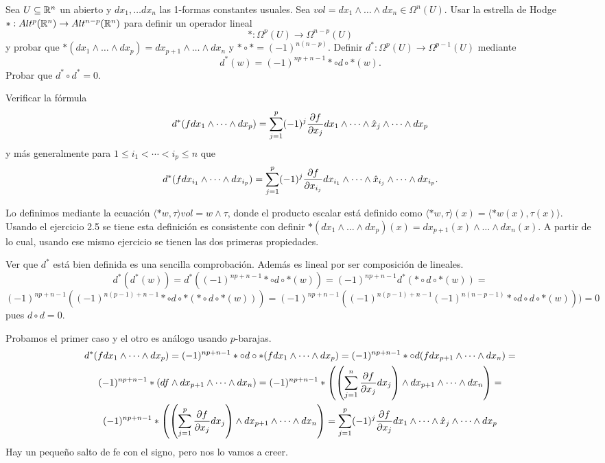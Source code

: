 \documentclass[twoside]{article}
\begin{document}
\begin{ejercicio}{3.2}
Sea $U\subseteq\mathbb{R}^n$ un abierto y $dx_1,\dots dx_n$ las 1-formas constantes usuales. Sea $vol=dx_1\land\dots\land dx_n\in\Omega^n(U)$. Usar la estrella de Hodge $*:Alt^p(\mathbb{R}^n)\to Alt^{n-p}(\mathbb{R}^n)$ para definir un operador lineal  $$*:\Omega^p(U)\to\Omega^{n-p}(U)$$
y probar que $*(dx_1\land\dots\land dx_p)=dx_{p+1}\land\dots\land dx_n$ y $*\circ *=(-1)^{n(n-p)}$. Definir $d^*:\Omega^p(U)\to\Omega^{p-1}(U)$ mediante
$$d^*(w)=(-1)^{np+n-1}*\circ d\circ *(w).$$
Probar que $d^*\circ d^*=0$. 

Verificar la fórmula 
\[
d^*(fdx_1\land\dots\land dx_p)=\sum_{j=1}^p(-1)^j\frac{\partial f}{\partial x_j}dx_1\land\dots\land\hat{x}_j\land\dots\land dx_p
\]
y más generalmente para $1\leq i_1<\cdots <i_p\leq n$ que 
\[
d^*(fdx_{i_1}\land\dots\land dx_{i_p})=\sum_{j=1}^p(-1)^j\frac{\partial f}{\partial x_{i_j}}dx_{i_1}\land\dots\land\hat{x}_{i_j}\land\dots\land dx_{i_p}.
\]
\end{ejercicio}
\begin{solucion}
Lo definimos mediante la ecuación $\langle *w,\tau\rangle vol =w\land\tau$, donde el producto escalar está definido como $\langle *w,\tau\rangle(x)=\langle *w(x), \tau(x)\rangle$. Usando el ejercicio 2.5 se tiene esta definición es consistente con definir $*(dx_1\land\dots\land dx_p)(x)=dx_{p+1}(x)\land\dots\land dx_n(x)$. A partir de lo cual, usando ese mismo ejercicio se tienen las dos primeras propiedades.

Ver que $d^*$ está bien definida es una sencilla comprobación. Además es lineal por ser composición de lineales.
\[
d^*(d^*(w))=d^*((-1)^{np+n-1}*\circ d\circ *(w))=(-1)^{np+n-1}d^*(*\circ d\circ *(w))=
\]
\[
(-1)^{np+n-1}((-1)^{n(p-1)+n-1}*\circ d\circ *(*\circ d\circ *(w)))=(-1)^{np+n-1}((-1)^{n(p-1)+n-1}(-1)^{n(n-p-1)}*\circ d\circ d\circ *(w)))=0
\]
pues $d\circ d=0$.

Probamos el primer caso y el otro es análogo usando $p$-barajas.
\begin{gather*}
d^*(fdx_1\land\dots\land dx_p)=(-1)^{np+n-1}*\circ d\circ *(fdx_1\land\dots\land dx_p)=(-1)^{np+n-1}*\circ d( f dx_{p+1}\land\dots\land dx_n)=\\
(-1)^{np+n-1}*(d f\land dx_{p+1}\land\dots\land dx_n)=(-1)^{np+n-1}*\left(\left(\sum_{j=1}^n\frac{\partial f}{\partial x_j}dx_j\right)\land dx_{p+1}\land\dots\land dx_n\right)=\\
(-1)^{np+n-1}*\left(\left(\sum_{j=1}^p\frac{\partial f}{\partial x_j}dx_j\right)\land dx_{p+1}\land\dots\land dx_n\right)=\sum_{j=1}^p(-1)^j\frac{\partial f}{\partial x_j}dx_1\land\dots\land\hat{x}_j\land\dots\land dx_p
\end{gather*}
Hay un pequeño salto de fe con el signo, pero nos lo vamos a creer.
\end{solucion}
\newpage
\end{document}
